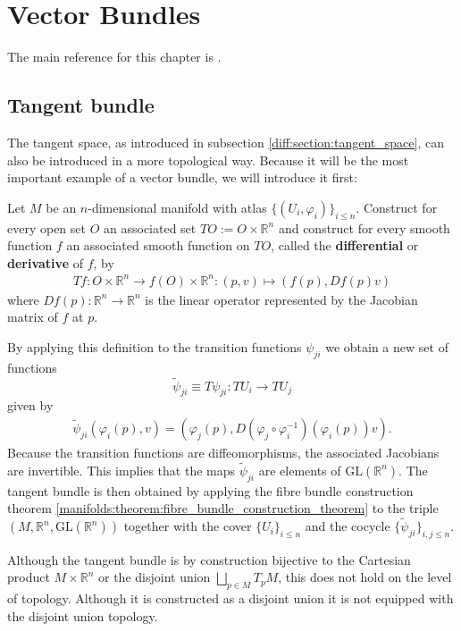 \chapter{Vector Bundles}\label{chapter:vector_bundles}

    The main reference for this chapter is \cite{bott_tu}.

\section{Tangent bundle}

    The tangent space, as introduced in subsection \ref{diff:section:tangent_space}, can also be introduced in a more topological way. Because it will be the most important example of a vector bundle, we will introduce it first:
    \begin{construct}
        Let $M$ be an $n$-dimensional manifold with atlas $\{(U_i,\varphi_i)\}_{i\leq n}$. Construct for every open set $O$ an associated set $TO := O\times\mathbb{R}^n$ and construct for every smooth function $f$ an associated smooth function on $TO$, called the \textbf{differential} or \textbf{derivative} of $f$, by
        \begin{gather}
            \label{diff:manifolds:T_function}
            Tf:O\times\mathbb{R}^n\rightarrow f(O)\times\mathbb{R}^n:(p, v)\mapsto(f(p), Df(p)v)
        \end{gather}
        where $Df(p):\mathbb{R}^n\rightarrow\mathbb{R}^n$ is the linear operator represented by the Jacobian matrix of $f$ at $p$.

        By applying this definition to the transition functions $\psi_{ji}$ we obtain a new set of functions \[\widetilde{\psi}_{ji} \equiv T\psi_{ji}:TU_i\rightarrow TU_j\] given by
        \begin{gather}
            \widetilde{\psi}_{ji}(\varphi_i(p),v) = \left(\varphi_j(p), D(\varphi_j\circ\varphi_i^{-1})(\varphi_i(p))v\right).
        \end{gather}
        Because the transition functions are diffeomorphisms, the associated Jacobians are invertible. This implies that the maps $\widetilde\psi_{ji}$ are elements of $\text{GL}(\mathbb{R}^n)$. The tangent bundle is then obtained by applying the fibre bundle construction theorem \ref{manifolds:theorem:fibre_bundle_construction_theorem} to the triple $(M, \mathbb{R}^n,\text{GL}(\mathbb{R}^n))$ together with the cover $\{U_i\}_{i\leq n}$ and the cocycle $\{\widetilde\psi_{ji}\}_{i,j\leq n}$.
    \end{construct}
    \begin{remark}
        Although the tangent bundle is by construction bijective to the Cartesian product $M\times\mathbb{R}^n$ or the disjoint union $\bigsqcup_{p\in M}T_pM$, this does not hold on the level of topology. Although it is constructed as a disjoint union it is not equipped with the disjoint union topology.
    \end{remark}

